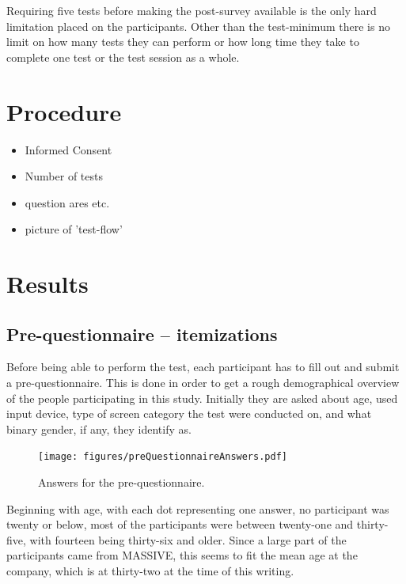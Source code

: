 \documentclass[nofilelist,dvipsnames]{cslthse-msc}
\begin{document}
      Requiring five tests before making the post-survey available is the only
      hard limitation placed on the participants. Other than the test-minimum
      there is no limit on how many tests they can perform or how long time
      they take to complete one test or the test session as a whole.

    \section{Procedure}

      \begin{itemize}
        \item{Informed Consent}
        \item{Number of tests}
        \item{question ares etc.}
        \item{picture of 'test-flow'}
      \end{itemize}

		\section{Results}

			\subsection{Pre-questionnaire -- itemizations}

        Before being able to perform the test, each participant has to fill
        out and submit a pre-questionnaire. This is done in order to get
        a rough demographical overview of the people participating in this
        study. Initially they are asked about age, used input device, type of
        screen category the test were conducted on, and what binary gender, if
        any, they identify as.

				\begin{figure}[h!]
					\centering
					\texttt{[image: figures/preQuestionnaireAnswers.pdf]}
					\caption{Answers for the pre-questionnaire.}
				\end{figure}

        Beginning with age, with each dot representing one answer, no
        participant was twenty or below, most of the  participants were between
        twenty-one and thirty-five, with fourteen being thirty-six and older.
        Since a large part of the participants came from MASSIVE, this seems to
        fit the mean age at the company, which is at thirty-two{\findref} at
        the time of this writing.
\end{document}
